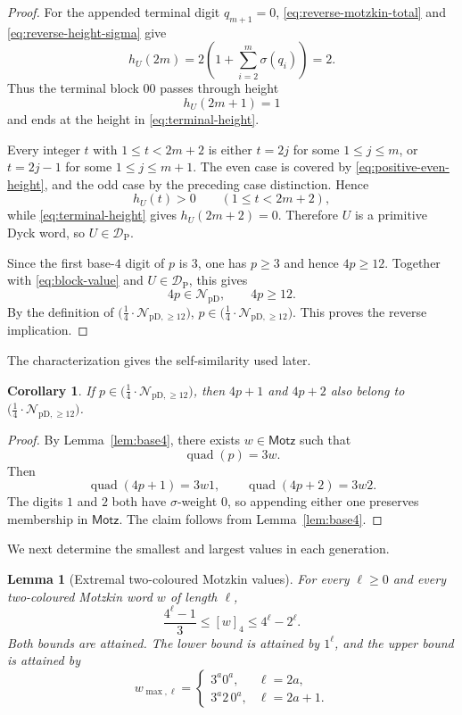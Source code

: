 \documentclass[12pt]{article}
\theoremstyle{plain}
\newtheorem{lemma}[theorem]{Lemma}
\newtheorem{corollary}[theorem]{Corollary}
\theoremstyle{definition}
\theoremstyle{plain}
\newcommand{\NpD}{\mathcal{N}_{\mathrm{pD}}}
\newcommand{\DP}{\mathcal{D}_{\mathrm{P}}}
\newcommand{\Pset}{%
  \bigl(\tfrac{1}{4}\cdot\mathcal{N}_{\mathrm{pD},\geq 12}\bigr)%
}
\begin{document}
\begin{proof}
For the appended terminal digit $q_{m+1}=0$,
\eqref{eq:reverse-motzkin-total} and
\eqref{eq:reverse-height-sigma} give
\[
 h_U(2m)=2\left(1+\sum_{i=2}^{m}\sigma(q_i)\right)=2.
\]
Thus the terminal block $00$ passes through height
\[
 h_U(2m+1)=1
\]
and ends at the height in \eqref{eq:terminal-height}.

Every integer $t$ with $1\leq t<2m+2$ is either $t=2j$ for some
$1\leq j\leq m$, or $t=2j-1$ for some $1\leq j\leq m+1$.
The even case is covered by \eqref{eq:positive-even-height}, and the odd
case by the preceding case distinction.  Hence
\[
 h_U(t)>0\qquad(1\leq t<2m+2),
\]
while \eqref{eq:terminal-height} gives $h_U(2m+2)=0$.  Therefore $U$ is a
primitive Dyck word, so $U\in\DP$.

Since the first base-$4$ digit of $p$ is $3$, one has $p\geq3$ and hence
$4p\geq12$.  Together with \eqref{eq:block-value} and $U\in\DP$, this gives
\[
 4p\in\NpD,\qquad 4p\geq12.
\]
By the definition of $\Pset$, $p\in\Pset$.  This proves the reverse
implication.
\end{proof}

The characterization gives the self-similarity used later.

\begin{corollary}\label{cor:Pclosure}
If $p\in\Pset$, then $4p+1$ and $4p+2$ also belong to $\Pset$.
\end{corollary}

\begin{proof}
By Lemma~\ref{lem:base4}, there exists $w\in\mathsf{Motz}$ such that
\[
 \operatorname{quad}(p)=3w.
\]
Then
\[
 \operatorname{quad}(4p+1)=3w1,
 \qquad
 \operatorname{quad}(4p+2)=3w2.
\]
The digits $1$ and $2$ both have $\sigma$-weight $0$, so appending either one
preserves membership in $\mathsf{Motz}$.  The claim follows from
Lemma~\ref{lem:base4}.
\end{proof}

We next determine the smallest and largest values in each generation.

\begin{lemma}[Extremal two-coloured Motzkin values]\label{lem:extremal}
For every $\ell\geq0$ and every two-coloured Motzkin word $w$ of length $\ell$,
\begin{equation}\label{eq:motzkin-extrema}
  \frac{4^{\ell}-1}{3}\leq[w]_4\leq4^{\ell}-2^{\ell}.
\end{equation}
Both bounds are attained.  The lower bound is attained by $1^{\ell}$, and the
upper bound is attained by
\[
  w_{\max,\ell}=
  \begin{cases}
    3^a0^a,&\ell=2a,\\
    3^a2\,0^a,&\ell=2a+1.
  \end{cases}
\]
\end{lemma}
\end{document}
